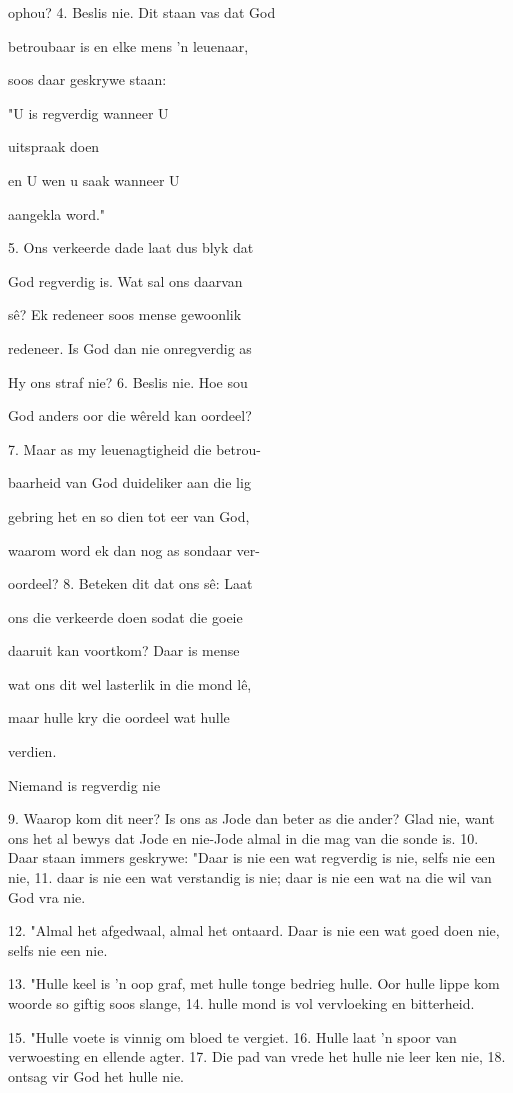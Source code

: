 ophou?  4.  Beslis nie.  Dit staan vas dat God 

betroubaar is en elke mens 'n leuenaar, 

soos daar geskrywe staan:  

"U is regverdig wanneer U 

uitspraak doen 

en U wen u saak wanneer U 

aangekla word."

5.  Ons verkeerde dade laat dus blyk dat 

God regverdig is.  Wat sal ons daarvan 

sê?  Ek redeneer soos mense gewoonlik 

redeneer.  Is God dan nie onregverdig as 

Hy ons straf nie?  6.  Beslis nie.  Hoe sou 

God anders oor die wêreld kan oordeel?  

7.  Maar as my leuenagtigheid die betrou-

baarheid van God duideliker aan die lig 

gebring het en so dien tot eer van God, 

waarom word ek dan nog as sondaar ver-

oordeel?  8.  Beteken dit dat ons sê:  Laat 

ons die verkeerde doen sodat die goeie 

daaruit kan voortkom?  Daar is mense 

wat ons dit wel lasterlik in die mond lê, 

maar hulle kry die oordeel wat hulle 

verdien.


Niemand is regverdig nie

9.  Waarop kom dit neer?  Is ons as Jode 
dan beter as die ander?  Glad nie, want 
ons het al bewys dat Jode en nie-Jode 
almal in die mag van die sonde is.  10.  Daar 
staan immers geskrywe:
"Daar is nie een wat regverdig is nie,
selfs nie een nie,
11.  daar is nie een wat verstandig is nie;
daar is nie een 
wat na die wil van God
vra nie.

12.  "Almal het afgedwaal,
almal het ontaard.
Daar is nie een wat goed doen nie,
selfs nie een nie.

13.  "Hulle keel is 'n oop graf, 
met hulle tonge bedrieg hulle.
Oor hulle lippe kom woorde 
so giftig soos slange, 
14.  hulle mond is vol vervloeking 
en bitterheid.

15.  "Hulle voete is vinnig om bloed 
te vergiet.
16.  Hulle laat 'n spoor van verwoesting 
en ellende agter.  
17.  Die pad van vrede het hulle 
nie leer ken nie, 
18.  ontsag vir God het hulle nie.

